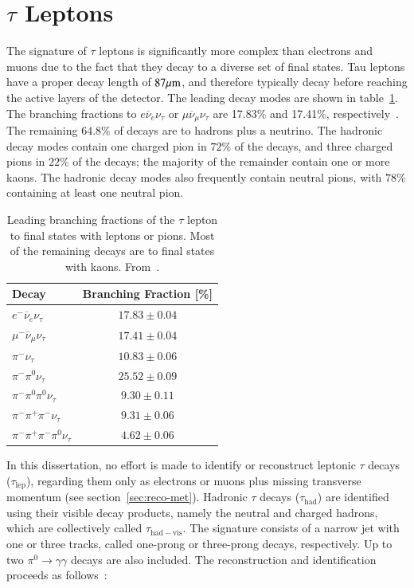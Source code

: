 \section{$\tau$ Leptons}\label{sec:event-reconstruction-taus}
The signature of $\tau$ leptons is significantly more complex than electrons and muons due to the fact that they decay to a diverse set of final states. Tau leptons have a proper decay length of $87 \mu\mathrm{m}$, and therefore typically decay before reaching the active layers of the detector. The leading decay modes are shown in table~\ref{table:reco-tau-decays}. The branching fractions to $e\overline{\nu}_e\nu_{\tau}$ or $\mu\overline{\nu}_{\mu}\nu_{\tau}$ are 17.83\% and 17.41\%, respectively~\cite{pdg}. The remaining $64.8\%$ of decays are to hadrons plus a neutrino. The hadronic decay modes contain one charged pion in $72\%$ of the decays, and three charged pions in $22\%$ of the decays; the majority of the remainder contain one or more kaons. The hadronic decay modes also frequently contain neutral pions, with $78\%$ containing at least one neutral pion. 


\begin{table}[htbp]
	\centering
	\begin{tabular}{|l|c|}
		\hline
		Decay & Branching Fraction [\%] \\
		\hline
		$e^- \overline{\nu}_e \nu_{\tau}$ & $17.83 \pm 0.04$ \\
		\hline
		$\mu^- \overline{\nu}_{\mu} \nu_{\tau}$ & $17.41 \pm 0.04$ \\
		\hline
		$\pi^- \nu_{\tau}$ & $10.83 \pm 0.06$ \\
		\hline
		$\pi^- \pi^0 \nu_{\tau}$ & $25.52 \pm 0.09$ \\
		\hline
		$\pi^- \pi^0\pi^0\nu_{\tau}$ & $ 9.30 \pm 0.11$ \\
		\hline
		$\pi^-\pi^+\pi^-\nu_{\tau}$ & $9.31 \pm 0.06$ \\
		\hline
		$\pi^-\pi^+\pi^-\pi^0\nu_{\tau}$ & $4.62 \pm 0.06$ \\
		\hline
	\end{tabular}
	\caption{Leading branching fractions of the $\tau$ lepton to final states with leptons or pions. Most of the remaining decays are to final states with kaons. From~\cite{pdg}.}
	\label{table:reco-tau-decays}
\end{table}

In this dissertation, no effort is made to identify or reconstruct leptonic $\tau$ decays ($\tau_{\mathrm{lep}}$), regarding them only as electrons or muons plus missing transverse momentum (see section~\ref{sec:reco-met}). Hadronic $\tau$ decays ($\tau_{\mathrm{had}}$) are identified using their visible decay products, namely the neutral and charged hadrons, which are collectively called $\tau_{\mathrm{had-vis}}$. The signature consists of a narrow jet with one or three tracks, called one-prong or three-prong decays, respectively. Up to two $\pi^0\rightarrow\gamma\gamma$ decays are also included. The reconstruction and identification proceeds as follows~\cite{TheATLASCollaboration:2015be}:


